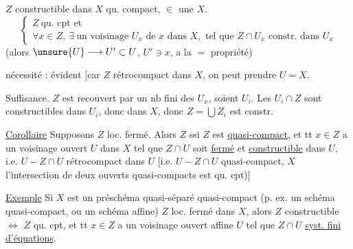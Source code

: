 $Z$ constructible dans $X$ qu. compact,
 $\in$ une  $X$.
\[
\left\{\begin{array}{l}
Z\ \text{qu. cpt et}\\
\forall x\in Z,\ \exists\ \text{un voisinage }U_x\text{ de }x\text{ dans }X,
\text{ tel que }Z\cap U_x\text{ constr. dans }U_x
\end{array}\right.
\]
(alors $\unsure{U}\longrightarrow U'\subset U$, $U'\ni x$, a la $=$ propriété)

nécessité : évident [car $Z$ rétrocompact dans $X$, 
 on peut prendre $U=X$.

Suffisance. $Z$ est recouvert par un nb fini des $U_x$, soient $U_i$.
Les $U_i\cap Z$ sont constructibles dans $U_i$, donc dans $X$,
donc $Z=\bigcup Z_i$ est constr.

\uline{Corollaire} Supposons $Z$ loc. fermé.
Alors $Z$ 
ssi $Z$ est \uline{quasi-compact}, et tt $x\in Z$ a un voisinage ouvert
$U$ dans $X$ tel que $Z\cap U$ soit \uline{fermé} et
\uline{constructible} dans $U$, i.e. $U-Z\cap U$ rétrocompact dans $U$
[i.e. $U-Z\cap U$ quasi-compact,
 $X$ l'intersection de deux ouverts quasi-compacts
est qu. cpt)]

\uline{Exemple} Si $X$ est un préschéma quasi-séparé quasi-compact
(p. ex. un schéma quasi-compact, ou un schéma affine) 
$Z$ loc. fermé dans $X$, alors $Z$ constructible $\Longleftrightarrow$
$Z$ qu. cpt, et tt $x\in Z$ a un voisinage ouvert affine $U$ tel que
$Z\cap U$  \uline{syst. fini} \uline{d'équations}.

